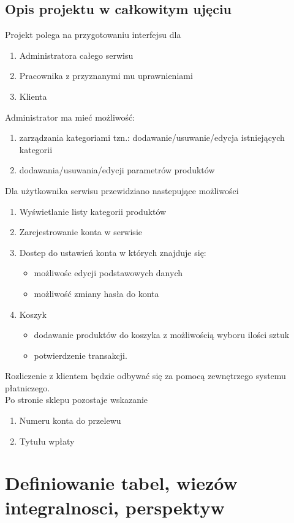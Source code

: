 \subsection{Opis projektu w całkowitym ujęciu}
Projekt polega na przygotowaniu interfejsu dla 
\begin{enumerate}
\item Administratora całego serwisu
\item Pracownika z przyznanymi mu uprawnieniami
\item Klienta
\end{enumerate}
Administrator ma mieć możliwość:
\begin{enumerate}
\item zarządzania kategoriami tzn.: dodawanie/usuwanie/edycja istniejących kategorii
\item dodawania/usuwania/edycji parametrów produktów
\end{enumerate}
Dla użytkownika serwisu przewidziano nastepujące możliwości
\begin{enumerate}
\item Wyświetlanie listy kategorii produktów
\item Zarejestrowanie konta w serwisie
\item Dostep do ustawień konta w których znajduje się:
\begin{itemize}
\item możliwośc edycji podstawowych danych
\item możliwość zmiany hasła do konta
\end{itemize}
\item Koszyk
\begin{itemize}
\item dodawanie produktów do koszyka z możliwością wyboru ilości sztuk
\item potwierdzenie transakcji.
\end{itemize}

\end{enumerate}	

Rozliczenie z klientem będzie odbywać się za pomocą zewnętrzego systemu płatniczego.\\
Po stronie sklepu pozostaje wskazanie
\begin{enumerate}
	\item Numeru konta do przelewu
	\item Tytułu wpłaty
\end{enumerate}
\section{Definiowanie tabel, wiezów integralnosci, perspektyw}

